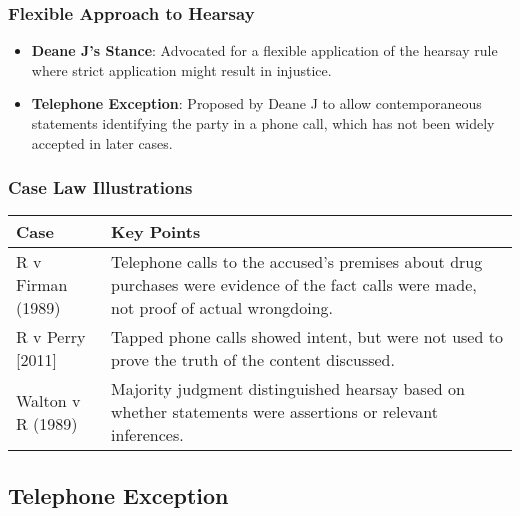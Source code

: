 \subsubsection{Flexible Approach to
Hearsay}\label{flexible-approach-to-hearsay}

\begin{itemize}
\tightlist
\item
  \textbf{Deane J's Stance}: Advocated for a flexible application of the
  hearsay rule where strict application might result in injustice.
\item
  \textbf{Telephone Exception}: Proposed by Deane J to allow
  contemporaneous statements identifying the party in a phone call,
  which has not been widely accepted in later cases.
\end{itemize}

\subsubsection{Case Law Illustrations}\label{case-law-illustrations}

\begin{longtable}[]{@{}
  >{\raggedright\arraybackslash}p{}
  >{\raggedright\arraybackslash}p{}@{}}
\toprule\noalign{}
\begin{minipage}[b]{\linewidth}\raggedright
Case
\end{minipage} & \begin{minipage}[b]{\linewidth}\raggedright
Key Points
\end{minipage} \\
\midrule\noalign{}
\endhead
\bottomrule\noalign{}
\endlastfoot
R v Firman (1989) & Telephone calls to the accused's premises about drug
purchases were evidence of the fact calls were made, not proof of actual
wrongdoing. \\
R v Perry {[}2011{]} & Tapped phone calls showed intent, but were not
used to prove the truth of the content discussed. \\
Walton v R (1989) & Majority judgment distinguished hearsay based on
whether statements were assertions or relevant inferences. \\
\end{longtable}

\subsection{  Telephone Exception}\label{telephone-exception}

